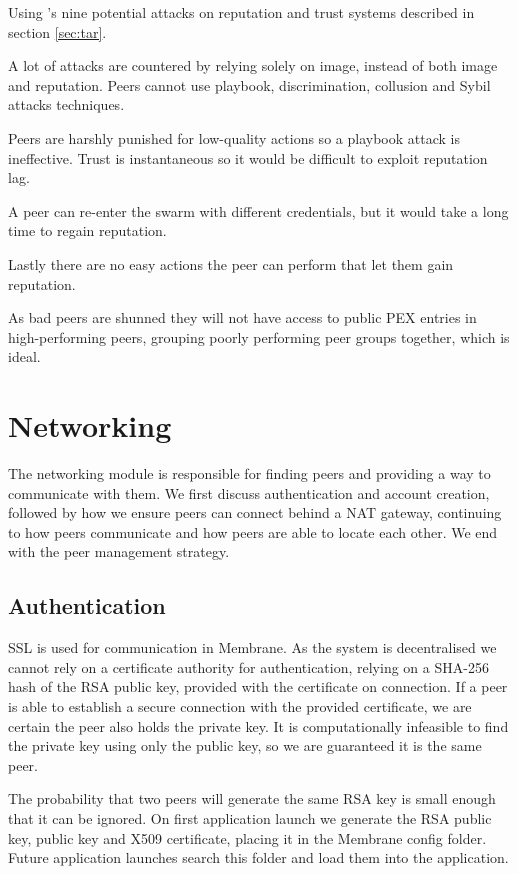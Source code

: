 \documentclass[11pt, a4paper, twoside]{report}
\begin{document}
Using \cite{josang2009challenges}'s nine potential attacks on reputation and trust systems described in section \ref{sec:tar}.

A lot of attacks are countered by relying solely on image, instead of both image and reputation. Peers cannot use playbook, discrimination, collusion and Sybil attacks techniques. 

Peers are harshly punished for low-quality actions so a playbook attack is ineffective. Trust is instantaneous so it would be difficult to exploit reputation lag. 

A peer can re-enter the swarm with different credentials, but it would take a long time to regain reputation.

Lastly there are no easy actions the peer can perform that let them gain reputation.

As bad peers are shunned they will not have access to public PEX entries in high-performing peers, grouping poorly performing peer groups together, which is ideal.

\section{Networking}

The networking module is responsible for finding peers and providing a way to communicate with them. We first discuss authentication and account creation, followed by how we ensure peers can connect behind a NAT gateway, continuing to how peers communicate and how peers are able to locate each other. We end with the peer management strategy. 

\subsection{Authentication}

SSL is used for communication in Membrane. As the system is decentralised we cannot rely on a certificate authority for authentication, relying on a SHA-256 hash of the RSA public key, provided with the certificate on connection. If a peer is able to establish a secure connection with the provided certificate, we are certain the peer also holds the private key. \citep{menezes1996handbook} It is computationally infeasible to find the private key using only the public key, so we are guaranteed it is the same peer.

The probability that two peers will generate the same RSA key is small enough that it can be ignored. On first application launch we generate the RSA public key, public key and X509 certificate, placing it in the Membrane config folder. Future application launches search this folder and load them into the application.
\end{document}
